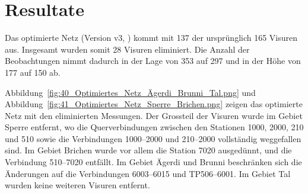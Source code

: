 \section{Resultate}
\label{sec:resultate}

Das optimierte Netz (Version v3, ) kommt mit 137 der ursprünglich 165 Visuren aus. Insgesamt wurden somit 28 Visuren
eliminiert. Die Anzahl der Beobachtungen nimmt dadurch in der Lage von 353 auf 297 und in der Höhe von 177 auf 150 ab.
\bigskip

Abbildung~\ref{fig:40_Optimiertes_Netz_Ägerdi_Brunni_Tal.png} und Abbildung~\ref{fig:41_Optimiertes_Netz_Sperre_Brichen.png}
zeigen das optimierte Netz mit den eliminierten Messungen. Der Grossteil der Visuren wurde im Gebiet Sperre entfernt,
wo die Querverbindungen zwischen den Stationen 1000, 2000, 210 und 510 sowie die Verbindungen 1000--2000 und 210--2000
vollständig weggefallen sind. Im Gebiet Brichen wurde vor allem die Station 7020 ausgedünnt, und die Verbindung
510--7020 entfällt. Im Gebiet Ägerdi und Brunni beschränken sich die Änderungen auf die Verbindungen 6003--6015 und
TP506--6001. Im Gebiet Tal wurden keine weiteren Visuren entfernt.

